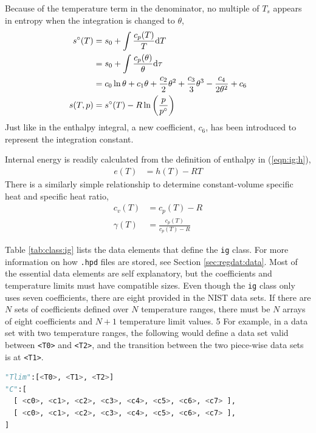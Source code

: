 Because of the temperature term in the denominator, no multiple of $T_s$ appears in entropy when the integration is changed to $\theta$,
\begin{align}
s^\circ(T) &= s_0 + \int \frac{c_p(T)}{T}\mathrm{d} T\nonumber\\
 &= s_0 + \int \frac{c_p(\theta)}{\theta}\mathrm{d} \tau\nonumber\\
 &= c_0 \ln \theta + c_1 \theta + \frac{c_2}{2} \theta^2 + \frac{c_3}{3} \theta^3 -\frac{c_4}{2\theta^2} + c_6\\
s(T,p) &= s^\circ(T) - R \ln \left( \frac{p}{p^\circ} \right)\nonumber
\end{align}
Just like in the enthalpy integral, a new coefficient, $c_6$, has been introduced to represent the integration constant.

Internal energy is readily calculated from the definition of enthalpy in (\ref{eqn:ig:h}),
\begin{align}
e(T) &= h(T) - RT
\end{align}
There is a similarly simple relationship to determine constant-volume specific heat and specific heat ratio,
\begin{align}
c_v(T) &= c_p(T) - R\\
\gamma(T) &= \frac{c_p(T)}{c_p(T)-R}
\end{align}

Table \ref{tab:class:ig} lists the data elements that define the \texttt{ig} class.  For more information on how \texttt{.hpd} files are stored, see Section \ref{sec:regdat:data}.  Most of the essential data elements are self explanatory, but the coefficients and temperature limits must have compatible sizes.  Even though the \texttt{ig} class only uses seven coefficients, there are eight provided in the NIST data sets.  If there are $N$ sets of coefficients defined over $N$ temperature ranges, there must be $N$ arrays of eight coefficients and $N+1$ temperature limit values.
5
For example, in a data set with two temperature ranges, the following would define a data set valid between \texttt{<T0>} and \texttt{<T2>}, and the transition between the two piece-wise data sets is at \texttt{<T1>}.
\begin{lstlisting}[language=Python]
"Tlim":[<T0>, <T1>, <T2>]
"C":[
  [ <c0>, <c1>, <c2>, <c3>, <c4>, <c5>, <c6>, <c7> ],
  [ <c0>, <c1>, <c2>, <c3>, <c4>, <c5>, <c6>, <c7> ],
]
\end{lstlisting}

